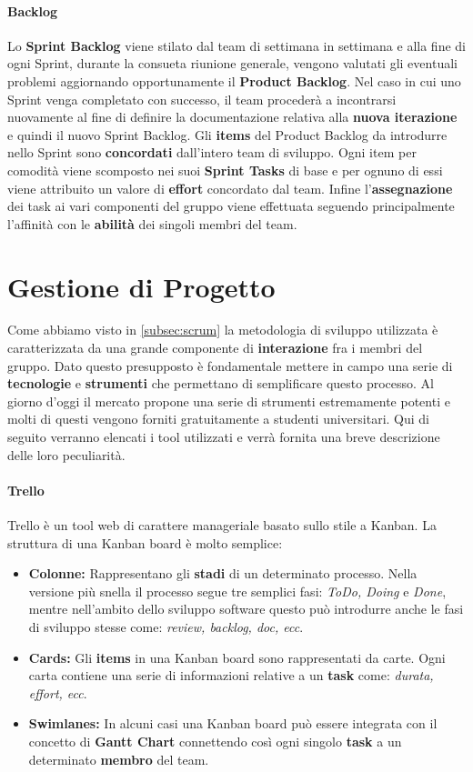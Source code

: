 	\paragraph{Backlog} %
	\label{par:backlog}
	Lo \textbf{Sprint Backlog} viene stilato dal team di settimana in settimana e alla fine di ogni Sprint, durante la consueta riunione generale, vengono valutati gli eventuali problemi aggiornando opportunamente il \textbf{Product Backlog}. Nel caso in cui uno Sprint venga completato con successo, il team procederà a incontrarsi nuovamente al fine di definire la documentazione relativa alla \textbf{nuova iterazione} e quindi il nuovo Sprint Backlog. Gli \textbf{items} del Product Backlog da introdurre nello Sprint sono \textbf{concordati} dall'intero team di sviluppo. Ogni item per comodità viene scomposto nei suoi \textbf{Sprint Tasks} di base e per ognuno di essi viene attribuito un valore di \textbf{effort} concordato dal team. Infine l'\textbf{assegnazione} dei task ai vari componenti del gruppo viene effettuata seguendo principalmente l'affinità con le \textbf{abilità} dei singoli membri del team.  

\section{Gestione di Progetto}
Come abbiamo visto in \ref{subsec:scrum} la metodologia di sviluppo utilizzata è caratterizzata da una grande componente di \textbf{interazione} fra i membri del gruppo. Dato questo presupposto è fondamentale mettere in campo una serie di \textbf{tecnologie} e \textbf{strumenti} che permettano di semplificare questo processo. Al giorno d'oggi il mercato propone una serie di strumenti estremamente potenti e molti di questi vengono forniti gratuitamente a studenti universitari. Qui di seguito verranno elencati i tool utilizzati e verrà fornita una breve descrizione delle loro peculiarità.

\paragraph{Trello} %
 Trello è un tool web di carattere manageriale basato sullo stile a Kanban. La struttura di una Kanban board è molto semplice: 
 \begin{itemize}
 	\item{\textbf{Colonne:}}
 	Rappresentano gli \textbf{stadi} di un determinato processo. Nella versione più snella il processo segue tre semplici fasi: \textit{ToDo, Doing} e \textit{Done}, mentre nell'ambito dello sviluppo software questo può introdurre anche le fasi di sviluppo stesse come: \textit{review, backlog, doc, ecc}.
 	\item{\textbf{Cards:}}
 	Gli \textbf{items} in una Kanban board sono rappresentati da carte. Ogni carta contiene una serie di informazioni relative a un \textbf{task} come: \textit{durata, effort, ecc}.
 	\item{\textbf{Swimlanes:}}
 	In alcuni casi una Kanban board può essere integrata con il concetto di \textbf{Gantt Chart} connettendo così ogni singolo \textbf{task} a un determinato \textbf{membro} del team.
 \end{itemize}

